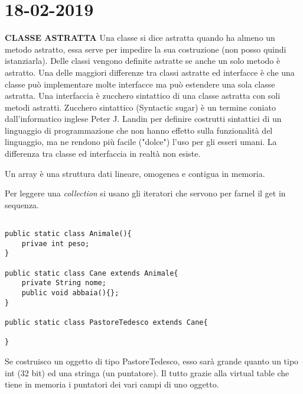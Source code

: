 
\newpage
\section{18-02-2019}
\textbf{CLASSE ASTRATTA} \newline
Una classe si dice astratta quando ha almeno un metodo astratto, essa serve per impedire la sua costruzione (non posso quindi istanziarla). Delle classi vengono definite astratte se anche un solo metodo è astratto. Una delle maggiori differenze tra classi astratte ed interfacce è che una classe può implementare molte interfacce ma può estendere una sola classe astratta. Una interfaccia è zucchero sintattico di una classe astratta con soli metodi astratti. Zucchero sintattico (Syntactic sugar) è un termine coniato dall'informatico inglese Peter J. Landin per definire costrutti sintattici di un linguaggio di programmazione che non hanno effetto sulla funzionalità del linguaggio, ma ne rendono più facile ("dolce") l'uso per gli esseri umani. La differenza tra classe ed interfaccia in realtà non esiste.

\noindent Un array è una struttura dati lineare, omogenea e contigua in memoria. \newline

\noindent Per leggere una \textit{collection} si usano gli iteratori che servono per farnel il get in sequenza.
\begin{lstlisting}[basicstyle=\small,]

public static class Animale(){
	privae int peso;
}

public static class Cane extends Animale{
	private String nome;
	public void abbaia(){};
}

public static class PastoreTedesco extends Cane{

}

\end{lstlisting}
Se costruisco un oggetto di tipo PastoreTedesco, esso sarà grande quanto un tipo int (32 bit) ed una stringa (un puntatore).
Il tutto grazie alla virtual table che tiene in memoria i puntatori dei vari campi di uno oggetto.






